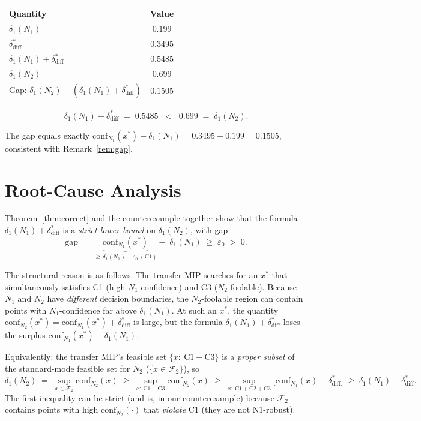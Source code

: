 \documentclass[12pt]{article}
\theoremstyle{definition}
\theoremstyle{plain}
\theoremstyle{remark}
\newcommand{\conf}[2]{\mathrm{conf}_{#1}(#2)}
\newcommand{\dN}[1]{\delta_1(N_{#1})}
\newcommand{\ddiff}{\delta_{\mathrm{diff}}^{*}}
\newcommand{\Ffool}[1]{\mathcal{F}_{#1}}
\begin{document}
\begin{center}
\renewcommand{\arraystretch}{1.5}
\begin{tabular}{lc}
\toprule
Quantity & Value \\
\midrule
$\dN{1}$ & $0.199$ \\
$\ddiff$ & $0.3495$ \\
$\dN{1}+\ddiff$ & $\mathbf{0.5485}$ \\
\midrule
$\dN{2}$ & $\mathbf{0.699}$ \\
\midrule
Gap: $\dN{2}-(\dN{1}+\ddiff)$ & $\mathbf{0.1505}$ \\
\bottomrule
\end{tabular}
\end{center}

\[
  \dN{1}+\ddiff
  \;=\; 0.5485
  \;\;\mathbf{<}\;\;
  0.699
  \;=\; \dN{2}.
\]

The gap equals exactly $\conf{N_1}{x^*}-\dN{1}=0.3495-0.199=0.1505$,
consistent with Remark~\ref{rem:gap}.

\section{Root-Cause Analysis}\label{sec:analysis}

Theorem~\ref{thm:correct} and the counterexample together show that
the formula $\dN{1}+\ddiff$ is a \emph{strict lower bound} on $\dN{2}$,
with gap
\[
  \mathrm{gap}
  \;=\;
  \underbrace{\conf{N_1}{x^*}}_{\geq\,\dN{1}+\varepsilon_0\;(\mathrm{C1})}
  -\;
  \dN{1}
  \;\geq\;\varepsilon_0\;>\;0.
\]

The structural reason is as follows.  The transfer MIP searches for an
$x^*$ that simultaneously satisfies C1 (high $N_1$-confidence) and C3
($N_2$-foolable).  Because $N_1$ and $N_2$ have \emph{different}
decision boundaries, the $N_2$-foolable region can contain points with
$N_1$-confidence far above $\dN{1}$.  At such an $x^*$, the quantity
$\conf{N_2}{x^*}=\conf{N_1}{x^*}+\ddiff$ is large, but the formula
$\dN{1}+\ddiff$ loses the surplus $\conf{N_1}{x^*}-\dN{1}$.

Equivalently: the transfer MIP's feasible set
$\{x:\ \mathrm{C1}+\mathrm{C3}\}$ is a \emph{proper subset} of the
standard-mode feasible set for $N_2$ ($\{x\in\Ffool{2}\}$), so
\[
  \dN{2}
  \;=\;
  \sup_{x\in\Ffool{2}}\conf{N_2}{x}
  \;\geq\;
  \sup_{x:\,\mathrm{C1+C3}}\conf{N_2}{x}
  \;\geq\;
  \sup_{x:\,\mathrm{C1+C2+C3}}\bigl[\conf{N_1}{x}+\ddiff\bigr]
  \;\geq\;
  \dN{1}+\ddiff.
\]
The first inequality can be strict (and is, in our counterexample)
because $\Ffool{2}$ contains points with high $\conf{N_2}{\cdot}$ that
\emph{violate} C1 (they are not N1-robust).
\end{document}
